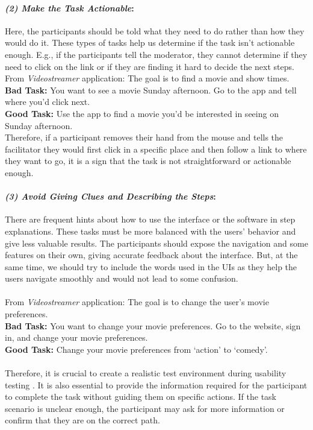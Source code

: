 \paragraph{\textit{(2) Make the Task Actionable}:}
Here, the participants should be told what they need to do rather than how they would do it.
These types of tasks help us determine if the task isn’t actionable enough. 
E.g., if the participants tell the moderator, they cannot determine if they need to click on the link or if they are finding it hard to decide the next steps. \\
From \textit{Videostreamer} application: The goal is to find a movie and show times. \\
\textbf{Bad Task: } You want to see a movie Sunday afternoon. Go to the app and tell where you’d click next. \\
\textbf{Good Task: } Use the app to find a movie you’d be interested in seeing on Sunday afternoon. \\
Therefore, if a participant removes their hand from the mouse and tells the facilitator they would first click in a specific place and then follow a link to where they want to go, it is a sign that the task is not straightforward or actionable enough.

\paragraph{\textit{(3) Avoid Giving Clues and Describing the Steps}:}
There are frequent hints about how to use the interface or the software in step explanations.
These tasks must be more balanced with the users' behavior and give less valuable results.   
The participants should expose the navigation and some features on their own, giving accurate feedback about the interface.
But, at the same time, we should try to include the words used in the UIs as they help the users navigate smoothly and would not lead to some confusion. \\\\
From \textit{Videostreamer} application: The goal is to change the user's movie preferences. \\
\textbf{Bad Task: } You want to change your movie preferences. Go to the website, sign in, and change your movie preferences. \\
\textbf{Good Task: } Change your movie preferences from `action' to `comedy'. \\\\
Therefore, it is crucial to create a realistic test environment during usability testing \cite{article:usability:doesburg}. 
It is also essential to provide the information required for the participant to complete the task without guiding them on specific actions. 
If the task scenario is unclear enough, the participant may ask for more information or confirm that they are on the correct path.

